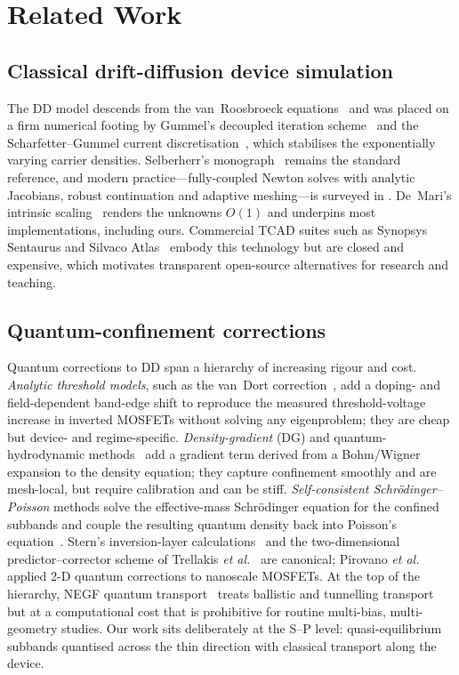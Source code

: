 \documentclass[conference]{IEEEtran}
\begin{document}
\section{Related Work}
\label{sec:related}

\subsection{Classical drift-diffusion device simulation}
The DD model descends from the van~Roosbroeck equations~\cite{vanroosbroeck} and
was placed on a firm numerical footing by Gummel's decoupled iteration
scheme~\cite{gummel} and the Scharfetter--Gummel current
discretisation~\cite{scharfetter}, which stabilises the exponentially varying
carrier densities. Selberherr's monograph~\cite{selberherr} remains the standard
reference, and modern practice---fully-coupled Newton solves with analytic
Jacobians, robust continuation and adaptive meshing---is surveyed in
\cite{bank,vasileska}. De~Mari's intrinsic scaling~\cite{demari} renders the
unknowns $O(1)$ and underpins most implementations, including ours. Commercial
TCAD suites such as Synopsys Sentaurus and Silvaco Atlas~\cite{sentaurus} embody
this technology but are closed and expensive, which motivates transparent
open-source alternatives for research and teaching.

\subsection{Quantum-confinement corrections}
Quantum corrections to DD span a hierarchy of increasing rigour and cost.
\emph{Analytic threshold models}, such as the van~Dort correction~\cite{vandort},
add a doping- and field-dependent band-edge shift to reproduce the measured
threshold-voltage increase in inverted MOSFETs without solving any eigenproblem;
they are cheap but device- and regime-specific. \emph{Density-gradient} (DG) and
quantum-hydrodynamic methods~\cite{ancona,hansch,jungel} add a gradient term
derived from a Bohm/Wigner expansion to the density equation; they capture
confinement smoothly and are mesh-local, but require calibration and can be stiff.
\emph{Self-consistent Schr\"odinger--Poisson} methods solve the effective-mass
Schr\"odinger equation for the confined subbands and couple the resulting quantum
density back into Poisson's equation~\cite{sternhoward,stern1972,laux,trellakis}.
Stern's inversion-layer calculations~\cite{stern1972} and the two-dimensional
predictor--corrector scheme of Trellakis \emph{et al.}~\cite{trellakis} are
canonical; Pirovano \emph{et al.}~\cite{pirovano} applied 2-D quantum corrections
to nanoscale MOSFETs. At the top of the hierarchy, NEGF quantum
transport~\cite{datta,lundstrom} treats ballistic and tunnelling transport but at
a computational cost that is prohibitive for routine multi-bias, multi-geometry
studies. Our work sits deliberately at the S--P level: quasi-equilibrium subbands
quantised across the thin direction with classical transport along the device.
\end{document}
